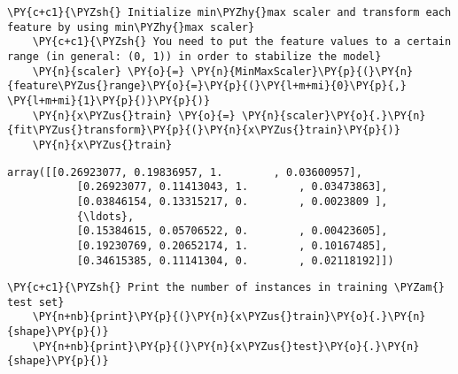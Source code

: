         \begin{tcolorbox}[breakable, size=fbox, boxrule=1pt, pad at break*=1mm,colback=cellbackground, colframe=cellborder]
    \begin{Verbatim}[commandchars=\\\{\}]
    \PY{c+c1}{\PYZsh{} Initialize min\PYZhy{}max scaler and transform each feature by using min\PYZhy{}max scaler}
    \PY{c+c1}{\PYZsh{} You need to put the feature values to a certain range (in general: (0, 1)) in order to stabilize the model}
    \PY{n}{scaler} \PY{o}{=} \PY{n}{MinMaxScaler}\PY{p}{(}\PY{n}{feature\PYZus{}range}\PY{o}{=}\PY{p}{(}\PY{l+m+mi}{0}\PY{p}{,} \PY{l+m+mi}{1}\PY{p}{)}\PY{p}{)}
    \PY{n}{x\PYZus{}train} \PY{o}{=} \PY{n}{scaler}\PY{o}{.}\PY{n}{fit\PYZus{}transform}\PY{p}{(}\PY{n}{x\PYZus{}train}\PY{p}{)}
    \PY{n}{x\PYZus{}train}
    \end{Verbatim}
    \end{tcolorbox}
    
                \begin{tcolorbox}[breakable, size=fbox, boxrule=.5pt, pad at break*=1mm, opacityfill=0]
    \begin{Verbatim}[commandchars=\\\{\}]
    array([[0.26923077, 0.19836957, 1.        , 0.03600957],
           [0.26923077, 0.11413043, 1.        , 0.03473863],
           [0.03846154, 0.13315217, 0.        , 0.0023809 ],
           {\ldots},
           [0.15384615, 0.05706522, 0.        , 0.00423605],
           [0.19230769, 0.20652174, 1.        , 0.10167485],
           [0.34615385, 0.11141304, 0.        , 0.02118192]])
    \end{Verbatim}
    \end{tcolorbox}
            
        \begin{tcolorbox}[breakable, size=fbox, boxrule=1pt, pad at break*=1mm,colback=cellbackground, colframe=cellborder]
    \begin{Verbatim}[commandchars=\\\{\}]
    \PY{c+c1}{\PYZsh{} Print the number of instances in training \PYZam{} test set}
    \PY{n+nb}{print}\PY{p}{(}\PY{n}{x\PYZus{}train}\PY{o}{.}\PY{n}{shape}\PY{p}{)}
    \PY{n+nb}{print}\PY{p}{(}\PY{n}{x\PYZus{}test}\PY{o}{.}\PY{n}{shape}\PY{p}{)}
    \end{Verbatim}
    \end{tcolorbox}
    
